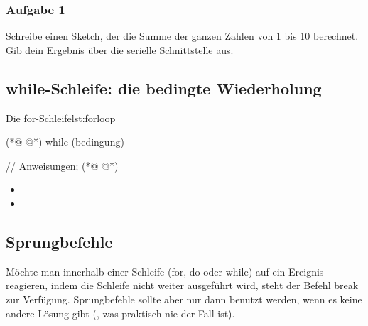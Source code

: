 \subsubsection{Aufgabe 1} 
Schreibe einen Sketch, der die Summe der ganzen Zahlen von 1 bis 10 berechnet. Gib dein Ergebnis über die serielle Schnittstelle aus.


\clearpage 
\subsection{while-Schleife: die bedingte Wiederholung}



\begin{multicols}{2}
\begin{arduinoCode}{Die for-Schleife}{lst:forloop}

           (*@  @*)
 while (bedingung) {
   
 // Anweisungen; (*@  @*)

}
\end{arduinoCode}

\vfill
\columnbreak

\begin{itemize}
  \itemsep15pt
  \item[] 
  
  \item[] 
\end{itemize}


\vfill 
\end{multicols}


\subsection{Sprungbefehle}

Möchte man innerhalb einer Schleife (for, do oder while) auf ein Ereignis reagieren, indem die Schleife nicht weiter ausgeführt wird, steht der Befehl break zur Verfügung. Sprungbefehle sollte aber nur dann benutzt werden, wenn es keine andere Lösung gibt (, was praktisch nie der Fall ist).



